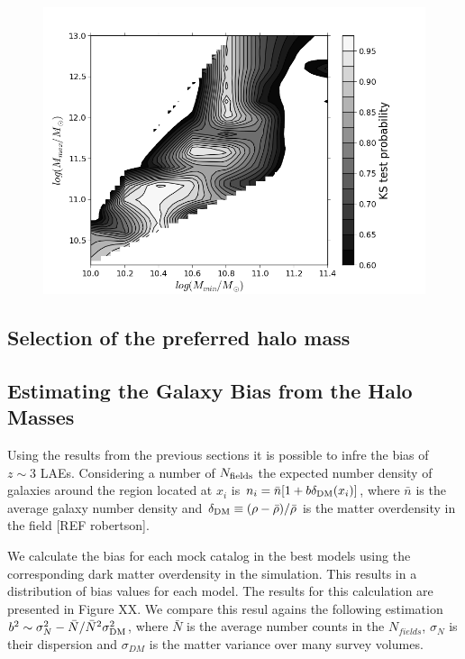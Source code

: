 \documentclass{emulateapj}
\begin{document}
\begin{figure}
\begin{center}
\includegraphics[width=1.00\linewidth,angle=0]{./plots/probabillity_contour06-10bar.png}
\end{center} 
\caption{ \label{figure:landscape} 
}
\end{figure}

\subsection{Selection of the preferred halo mass}




\subsection{Estimating the Galaxy Bias from the Halo Masses}
Using the results from the previous sections it is possible to infre the bias of $z\sim 3$ LAEs. Considering a number of $N_{\rm fields}$ the expected number density of galaxies around the region located at $x_{i}$ is $n_{i}=\bar{n}[1+ b\delta_{\rm DM}(x_{i})]$, where $\bar{n}$ is the average galaxy number density and $\delta_{\rm DM}\equiv (\rho - \bar{\rho})/\bar{\rho}$ is the matter overdensity in the field [REF robertson].

We calculate the bias for each mock catalog in the best models using the corresponding dark matter overdensity in the simulation. This results in a distribution of bias values for each model. The results for this calculation are presented in Figure XX.  We compare this resul agains the following estimation $b^{2}\sim {\sigma_{N}^{2} - \bar{N}}/\bar{N}^{2}\sigma_{\rm DM}^{2}$, where $\bar{N}$ is the average number counts in the $N_{fields}$, $\sigma_{N}$ is their dispersion and $\sigma_{DM}$ is the matter variance over many survey volumes.
\end{document}
